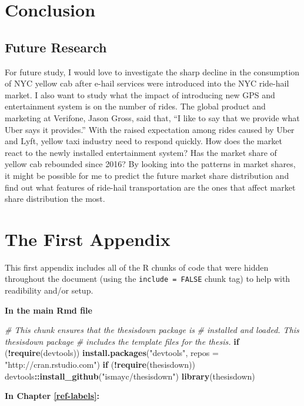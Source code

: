 \documentclass[12pt,twoside]{reedthesis}
\newenvironment{Shaded}{\begin{snugshade}}{\end{snugshade}}
\newcommand{\KeywordTok}[1]{\textcolor[rgb]{0.13,0.29,0.53}{\textbf{#1}}}
\newcommand{\DataTypeTok}[1]{\textcolor[rgb]{0.13,0.29,0.53}{#1}}
\newcommand{\StringTok}[1]{\textcolor[rgb]{0.31,0.60,0.02}{#1}}
\newcommand{\CommentTok}[1]{\textcolor[rgb]{0.56,0.35,0.01}{\textit{#1}}}
\newcommand{\ControlFlowTok}[1]{\textcolor[rgb]{0.13,0.29,0.53}{\textbf{#1}}}
\newcommand{\OperatorTok}[1]{\textcolor[rgb]{0.81,0.36,0.00}{\textbf{#1}}}
\newcommand{\NormalTok}[1]{#1}
\theoremstyle{definition}
\theoremstyle{definition}
\theoremstyle{definition}
\theoremstyle{remark}
\begin{document}
\chapter{Conclusion}\label{chapter5}

\section{Future Research}\label{future-research}

For future study, I would love to investigate the sharp decline in the
consumption of NYC yellow cab after e-hail services were introduced into
the NYC ride-hail market. I also want to study what the impact of
introducing new GPS and entertainment system is on the number of rides.
The global product and marketing at Verifone, Jason Gross, said that,
``I like to say that we provide what Uber says it provides.'' With the
raised expectation among rides caused by Uber and Lyft, yellow taxi
industry need to respond quickly. How does the market react to the newly
installed entertainment system? Has the market share of yellow cab
rebounded since 2016? By looking into the patterns in market shares, it
might be possible for me to predict the future market share distribution
and find out what features of ride-hail transportation are the ones that
affect market share distribution the most.

\appendix

\chapter{The First Appendix}\label{the-first-appendix}

This first appendix includes all of the R chunks of code that were
hidden throughout the document (using the \texttt{include\ =\ FALSE}
chunk tag) to help with readibility and/or setup.

\textbf{In the main Rmd file}
\begin{Shaded}
\begin{Highlighting}[]
\CommentTok{# This chunk ensures that the thesisdown package is}
\CommentTok{# installed and loaded. This thesisdown package}
\CommentTok{# includes the template files for the thesis.}
\ControlFlowTok{if}\NormalTok{ (}\OperatorTok{!}\KeywordTok{require}\NormalTok{(devtools)) }\KeywordTok{install.packages}\NormalTok{(}\StringTok{"devtools"}\NormalTok{, }
    \DataTypeTok{repos =} \StringTok{"http://cran.rstudio.com"}\NormalTok{)}
\ControlFlowTok{if}\NormalTok{ (}\OperatorTok{!}\KeywordTok{require}\NormalTok{(thesisdown)) devtools}\OperatorTok{::}\KeywordTok{install_github}\NormalTok{(}\StringTok{"ismayc/thesisdown"}\NormalTok{)}
\KeywordTok{library}\NormalTok{(thesisdown)}
\end{Highlighting}
\end{Shaded}
\textbf{In Chapter \ref{ref-labels}:}
\end{document}
